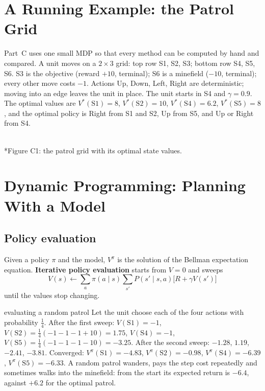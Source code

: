 \documentclass[11pt]{article}
\begin{document}
\section{A Running Example: the Patrol Grid}
Part~C uses one small MDP so that every method can be computed by hand and compared. A unit moves on a $2\times3$ grid: top row S1, S2, S3; bottom row S4, S5, S6. S3 is the objective (reward $+10$, terminal); S6 is a minefield ($-10$, terminal); every other move costs $-1$. Actions Up, Down, Left, Right are deterministic; moving into an edge leaves the unit in place. The unit starts in S4 and $\gamma=0.9$. The optimal values are $V^*(\text{S1})=8$, $V^*(\text{S2})=10$, $V^*(\text{S4})=6.2$, $V^*(\text{S5})=8$, and the optimal policy is Right from S1 and S2, Up from S5, and Up or Right from S4.
\begin{center}\\*{\small\color{GreyN}Figure C1: the patrol grid with its optimal state values.}\end{center}

\section{Dynamic Programming: Planning With a Model}
\subsection{Policy evaluation}
Given a policy $\pi$ and the model, $V^\pi$ is the solution of the Bellman expectation equation. \textbf{Iterative policy evaluation} starts from $V=0$ and sweeps
\[V(s)\leftarrow\sum_a\pi(a\mid s)\sum_{s'}P(s'\mid s,a)\big[R+\gamma V(s')\big]\]
until the values stop changing.
\begin{example}{evaluating a random patrol}
Let the unit choose each of the four actions with probability $\frac14$. After the first sweep: $V(\text{S1})=-1$, $V(\text{S2})=\frac14(-1-1-1+10)=1.75$, $V(\text{S4})=-1$, $V(\text{S5})=\frac14(-1-1-1-10)=-3.25$. After the second sweep: $-1.28$, $1.19$, $-2.41$, $-3.81$. Converged: $V^\pi(\text{S1})=-4.83$, $V^\pi(\text{S2})=-0.98$, $V^\pi(\text{S4})=-6.39$, $V^\pi(\text{S5})=-6.33$. A random patrol wanders, pays the step cost repeatedly and sometimes walks into the minefield: from the start its expected return is $-6.4$, against $+6.2$ for the optimal patrol.
\end{example}
\end{document}
